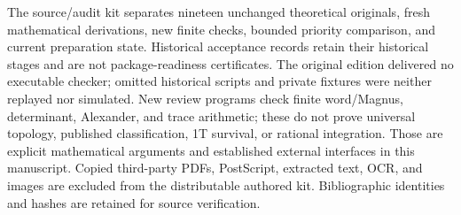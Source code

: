 \documentclass[11pt]{article}
\theoremstyle{remark}\newtheorem{remark}[theorem]{Remark}
\begin{document}
The source/audit kit separates nineteen unchanged theoretical originals,
fresh mathematical derivations, new finite checks, bounded priority
comparison, and current preparation state. Historical acceptance records
retain their historical stages and are not package-readiness certificates.
The original edition delivered no executable checker; omitted historical
scripts and private fixtures were neither replayed nor simulated. New
review programs check finite word/Magnus, determinant, Alexander, and trace
arithmetic; these do not prove universal topology, published classification,
1T survival, or rational integration. Those are explicit mathematical
arguments and established external interfaces in this manuscript.
Copied third-party PDFs, PostScript, extracted text, OCR, and images are
excluded from the distributable authored kit. Bibliographic identities
and hashes are retained for source verification.
\end{document}
